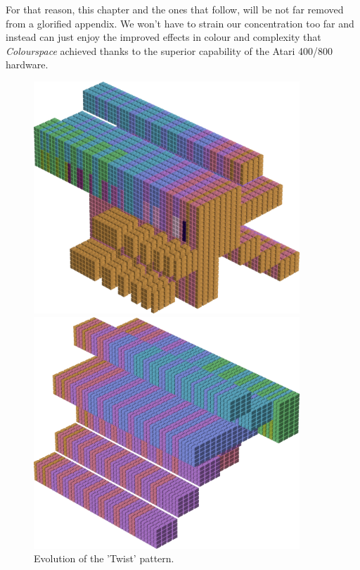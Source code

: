 For that reason, this chapter and the ones that follow, will
be not far removed from a glorified appendix. We won't have to strain our concentration too
far and instead can just enjoy the improved effects in colour and complexity that \textit{Colourspace}
achieved thanks to the superior capability of the Atari 400/800 hardware.


\clearpage
\begin{figure}[H]
    \centering
    \begin{adjustbox}{width=10cm,center}
      \includegraphics[width=10cm]{src/colorspace_patterns/pattern0-45.png}%
    \end{adjustbox}
    \begin{adjustbox}{width=10cm}
      \includegraphics[width=10cm]{src/colorspace_patterns/pattern0-225.png}%
    \end{adjustbox}
\caption{Evolution of the 'Twist' pattern.}
\end{figure}
\clearpage

